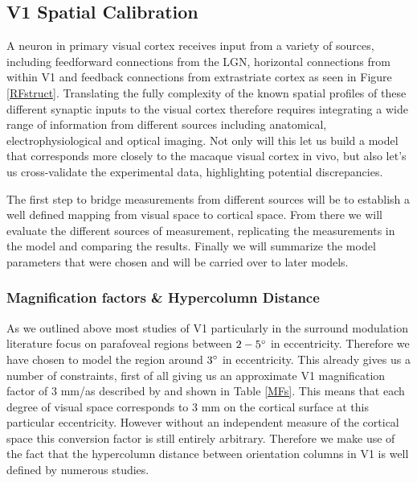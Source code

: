 \subsection{V1 Spatial Calibration}

A neuron in primary visual cortex receives input from a variety of
sources, including feedforward connections from the LGN, horizontal
connections from within V1 and feedback connections from extrastriate
cortex as seen in Figure \ref{RFstruct}. Translating the fully
complexity of the known spatial profiles of these different synaptic
inputs to the visual cortex therefore requires integrating a wide
range of information from different sources including anatomical,
electrophysiological and optical imaging. Not only will this let us
build a model that corresponds more closely to the macaque visual
cortex in vivo, but also let's us cross-validate the experimental
data, highlighting potential discrepancies.

The first step to bridge measurements from different sources will be
to establish a well defined mapping from visual space to cortical
space. From there we will evaluate the different sources of
measurement, replicating the measurements in the model and comparing
the results. Finally we will summarize the model parameters that were
chosen and will be carried over to later models.

\subsubsection{Magnification factors \& Hypercolumn Distance} \label{SCALHypercolumns}

As we outlined above most studies of V1 particularly in the surround
modulation literature focus on parafoveal regions between $2-5\degree$
in eccentricity. Therefore we have chosen to model the region around
$3\degree$ in eccentricity. This already gives us a number of
constraints, first of all giving us an approximate V1 magnification
factor of 3 mm/\degree as described by \cite{VanEssen1984} and shown in
Table \ref{MFs}. This means that each degree of visual space
corresponds to 3 mm on the cortical surface at this particular
eccentricity. However without an independent measure of the cortical
space this conversion factor is still entirely arbitrary. Therefore we
make use of the fact that the hypercolumn distance between orientation
columns in V1 is well defined by numerous studies.


